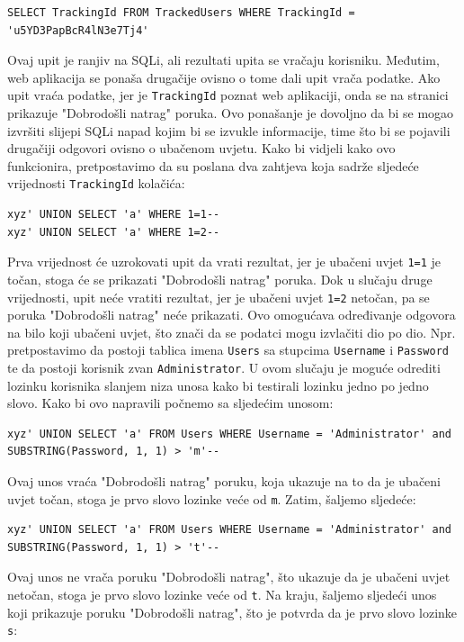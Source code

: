 \documentclass[12pt, oneside, onecolumn]{book}
\begin{document}
{\begin{verbatim}
SELECT TrackingId FROM TrackedUsers WHERE TrackingId = 'u5YD3PapBcR4lN3e7Tj4'
\end{verbatim}

Ovaj upit je ranjiv na SQLi, ali rezultati upita se vračaju korisniku. Međutim, web aplikacija se ponaša drugačije ovisno o tome dali upit vrača podatke. Ako upit vraća podatke, jer je \texttt{TrackingId} poznat web aplikaciji, onda se na stranici prikazuje "Dobrodošli natrag" poruka. Ovo ponašanje je dovoljno da bi se mogao izvršiti slijepi SQLi napad kojim bi se izvukle informacije, time što bi se pojavili drugačiji odgovori ovisno o ubačenom uvjetu. Kako bi vidjeli kako ovo funkcionira, pretpostavimo da su poslana dva zahtjeva koja sadrže sljedeće vrijednosti \texttt{TrackingId} kolačića:

\begin{verbatim}
xyz' UNION SELECT 'a' WHERE 1=1--
xyz' UNION SELECT 'a' WHERE 1=2--
\end{verbatim}

Prva vrijednost će uzrokovati upit da vrati rezultat, jer je ubačeni uvjet \texttt{1=1} je točan, stoga će se prikazati "Dobrodošli natrag" poruka. Dok u slučaju druge vrijednosti, upit neće vratiti rezultat, jer je ubačeni uvjet \texttt{1=2} netočan, pa se poruka "Dobrodošli natrag" neće prikazati. Ovo omogućava određivanje odgovora na bilo koji ubačeni uvjet, što znači da se podatci mogu izvlačiti dio po dio. Npr. pretpostavimo da postoji tablica imena \texttt{Users} sa stupcima \texttt{Username} i \texttt{Password} te da postoji korisnik zvan \texttt{Administrator}. U ovom slučaju je moguće odrediti lozinku korisnika slanjem niza unosa kako bi testirali lozinku jedno po jedno slovo. Kako bi ovo napravili počnemo sa sljedećim unosom:

\begin{verbatim}
xyz' UNION SELECT 'a' FROM Users WHERE Username = 'Administrator' and SUBSTRING(Password, 1, 1) > 'm'--
\end{verbatim}

Ovaj unos vraća "Dobrodošli natrag" poruku, koja ukazuje na to da je ubačeni uvjet točan, stoga je prvo slovo lozinke veće od \texttt{m}. Zatim, šaljemo sljedeće:

\begin{verbatim}
xyz' UNION SELECT 'a' FROM Users WHERE Username = 'Administrator' and SUBSTRING(Password, 1, 1) > 't'--
\end{verbatim}

Ovaj unos ne vrača poruku "Dobrodošli natrag", što ukazuje da je ubačeni uvjet netočan, stoga je prvo slovo lozinke veće od \texttt{t}. Na kraju, šaljemo sljedeći unos koji prikazuje poruku "Dobrodošli natrag", što je potvrda da je prvo slovo lozinke \texttt{s}:

}
\end{document}
